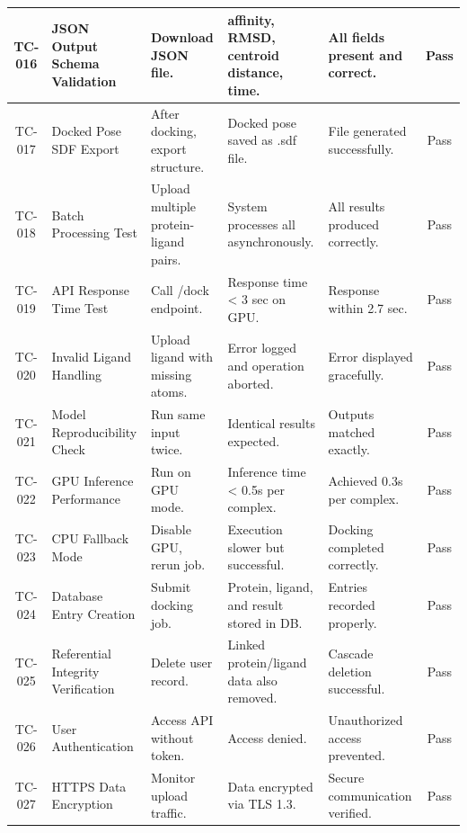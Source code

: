 \documentclass[12pt,a4]{report}
\begin{document}
\begin{center}
\begin{tabularx}{\textwidth}{|c|>{\RaggedRight\arraybackslash}X|>{\RaggedRight\arraybackslash}X|>{\RaggedRight\arraybackslash}X|>{\RaggedRight\arraybackslash}X|c|}
TC-016 & JSON Output Schema Validation &
Download JSON file. &
affinity, RMSD, centroid distance, time. &
All fields present and correct. &
Pass \\ \hline

TC-017 & Docked Pose SDF Export &
After docking, export structure. &
Docked pose saved as .sdf file. &
File generated successfully. &
Pass \\ \hline

TC-018 & Batch Processing Test &
Upload multiple protein-ligand pairs. &
System processes all asynchronously. &
All results produced correctly. &
Pass \\ \hline

TC-019 & API Response Time Test &
Call /dock endpoint. &
Response time < 3 sec on GPU. &
Response within 2.7 sec. &
Pass \\ \hline

TC-020 & Invalid Ligand Handling &
Upload ligand with missing atoms. &
Error logged and operation aborted. &
Error displayed gracefully. &
Pass \\ \hline

TC-021 & Model Reproducibility Check &
Run same input twice. &
Identical results expected. &
Outputs matched exactly. &
Pass \\ \hline

TC-022 & GPU Inference Performance &
Run on GPU mode. &
Inference time < 0.5s per complex. &
Achieved 0.3s per complex. &
Pass \\ \hline

TC-023 & CPU Fallback Mode &
Disable GPU, rerun job. &
Execution slower but successful. &
Docking completed correctly. &
Pass \\ \hline

TC-024 & Database Entry Creation &
Submit docking job. &
Protein, ligand, and result stored in DB. &
Entries recorded properly. &
Pass \\ \hline

TC-025 & Referential Integrity Verification &
Delete user record. &
Linked protein/ligand data also removed. &
Cascade deletion successful. &
Pass \\ \hline

TC-026 & User Authentication &
Access API without token. &
Access denied. &
Unauthorized access prevented. &
Pass \\ \hline

TC-027 & HTTPS Data Encryption &
Monitor upload traffic. &
Data encrypted via TLS 1.3. &
Secure communication verified. &
Pass \\ \hline


\end{tabularx}
\end{center}
\end{document}
